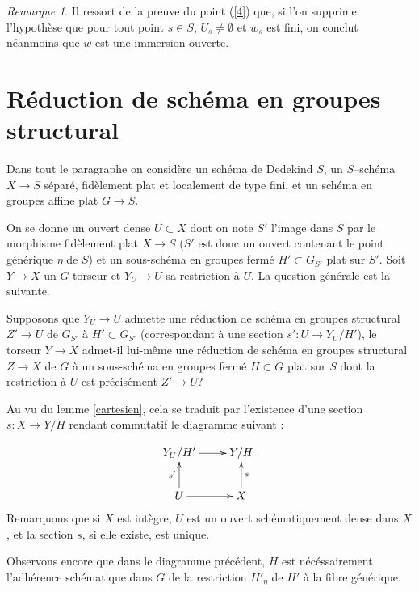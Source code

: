 \documentclass[11pt]{amsart}
\numberwithin{equation}{section}
\theoremstyle{definition}
\theoremstyle{remark}
\newtheorem{rem}[thm]{Remarque}
\begin{document}
\begin{enumerate}
\end{enumerate}
\endproof

\begin{rem}\label{technique-plus} Il ressort de la preuve du point (\ref{4}) que, si l'on supprime l'hypoth\`ese que pour tout point $s\in S$, $U_s \not=\emptyset$ et $w_s$ est fini, on conclut n\'eanmoins que $w$ est une immersion ouverte.
\end{rem}

\section{R\'eduction de sch\'ema en groupes structural}\label{reduction}

Dans tout le paragraphe on consid\`ere un sch\'ema de Dedekind $S$, un $S$--sch\'ema $X\to S$ s\'epar\'e, fid\`element plat et localement de type fini, et un sch\'ema en groupes affine plat $G\to S$.

On se donne  un ouvert dense $U \subset X$ dont on note $S'$ l'image dans $S$ par le morphisme fid\`element plat $X \to S$ ($S'$ est donc un ouvert contenant le point g\'en\'erique $\eta $ de $S$) et un sous-sch\'ema en groupes ferm\'e $H' \subset G_{S'}$ plat sur $S'$.   Soit $Y \to X$ un $G$-torseur et $Y_U\to U$ sa restriction \`a $U$.  La question g\'en\'erale est la suivante.

\smallskip
Supposons que $Y_U\to U$ admette une r\'eduction de sch\'ema en groupes structural $Z'\to U$ de $G_{S'}$ \`a $H' \subset G_{S'}$ (correspondant \`a une section $s': U \to Y_U/H'$), le torseur $Y \to X$ admet-il lui-m\^eme une r\'eduction de sch\'ema en groupes structural $Z\to X$ de $G$ \`a un sous-sch\'ema en groupes ferm\'e $H\subset G$ plat sur $S$ dont la restriction \`a $U$ est pr\'ecis\'ement $Z'\to U$?\
\smallskip

Au vu du lemme \ref{cartesien}, cela se traduit par l'existence d'une section $s: X \to Y/H$ rendant commutatif le diagramme suivant :

$$\xymatrix{
Y_U/H' \ar[r] &Y/H \\
U\ar[u]^{s'} \ar[r] &X\ar[u]_s\\
}.$$
Remarquons que si $X$ est int\`egre, $U$ est un ouvert sch\'ematiquement dense dans $X$, et la section $s$, si elle existe, est unique.

Observons encore que dans le diagramme pr\'ec\'edent, $H$ est n\'ec\'essairement l'adh\'erence sch\'ematique dans $G$ de la restriction $H'_\eta $ de $H'$ \`a la fibre g\'en\'erique.
\end{document}
